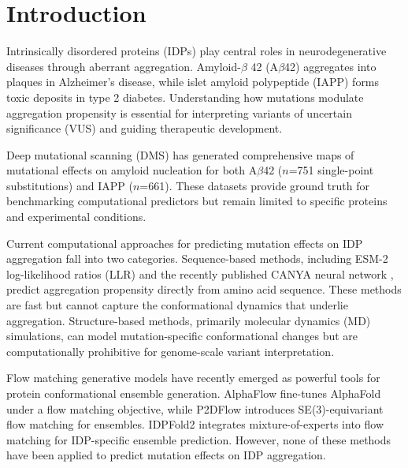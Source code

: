 \documentclass[10pt,letterpaper]{article}
\begin{document}
\section*{Introduction}

Intrinsically disordered proteins (IDPs) play central roles in neurodegenerative diseases through aberrant aggregation. Amyloid-$\beta$ 42 (A$\beta$42) aggregates into plaques in Alzheimer's disease, while islet amyloid polypeptide (IAPP) forms toxic deposits in type 2 diabetes. Understanding how mutations modulate aggregation propensity is essential for interpreting variants of uncertain significance (VUS) and guiding therapeutic development.

Deep mutational scanning (DMS) has generated comprehensive maps of mutational effects on amyloid nucleation for both A$\beta$42 \cite{seuma2022} ($n$=751 single-point substitutions) and IAPP \cite{badia2026} ($n$=661). These datasets provide ground truth for benchmarking computational predictors but remain limited to specific proteins and experimental conditions.

Current computational approaches for predicting mutation effects on IDP aggregation fall into two categories. Sequence-based methods, including ESM-2 log-likelihood ratios (LLR) \cite{lin2023} and the recently published CANYA neural network \cite{thompson2025}, predict aggregation propensity directly from amino acid sequence. These methods are fast but cannot capture the conformational dynamics that underlie aggregation. Structure-based methods, primarily molecular dynamics (MD) simulations, can model mutation-specific conformational changes but are computationally prohibitive for genome-scale variant interpretation.

Flow matching generative models have recently emerged as powerful tools for protein conformational ensemble generation. AlphaFlow \cite{jing2024} fine-tunes AlphaFold under a flow matching objective, while P2DFlow \cite{p2dflow2025} introduces SE(3)-equivariant flow matching for ensembles. IDPFold2 \cite{idpfold2_2026} integrates mixture-of-experts into flow matching for IDP-specific ensemble prediction. However, none of these methods have been applied to predict mutation effects on IDP aggregation.
\end{document}
